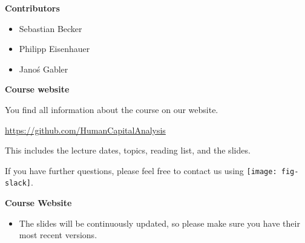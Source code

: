 \begin{frame}\textbf{Contributors}\vspace{0.3cm}

\begin{itemize}\setlength\itemsep{1em}
\item Sebastian Becker
\item Philipp Eisenhauer
\item Jano\'{s} Gabler
\end{itemize}

\end{frame}
\begin{frame}
	\textbf{Course website}\vspace{0.3cm}

You find all information about the course on our website.

\begin{center}
\url{https://github.com/HumanCapitalAnalysis}
\end{center}

This includes the lecture dates, topics, reading list, and the slides.\vspace{0.3cm}

If you have further questions, please feel free to contact us using
\texttt{[image: fig-slack]}.

\end{frame}
\begin{frame}
	\textbf{Course Website}\vspace{0.3cm}

\begin{itemize}
\item The slides will be continuously updated, so please make sure you have their most recent versions.
\end{itemize}

\end{frame}
